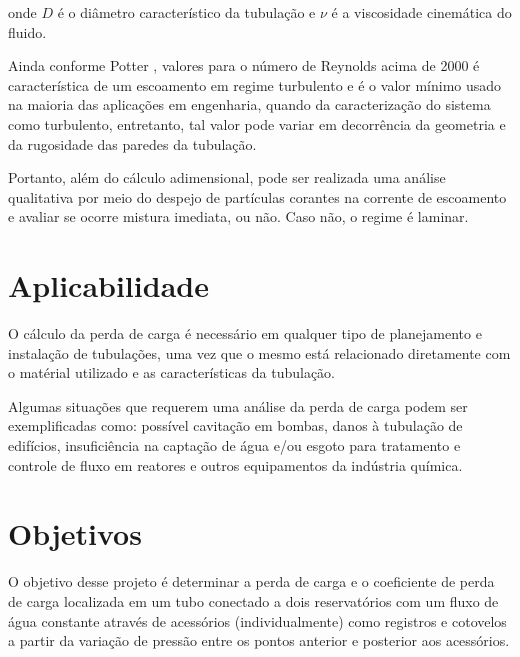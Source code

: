 onde $D$ é o diâmetro característico da tubulação e $\nu$ é a viscosidade 
cinemática do fluido.

Ainda conforme Potter \cite{Potter15}, valores para o número de 
Reynolds acima de 2000 é 
característica de um escoamento em regime
turbulento e é o valor mínimo usado na maioria das aplicações em engenharia, 
quando da caracterização do sistema como
turbulento, entretanto, tal valor pode variar em decorrência da geometria e da 
rugosidade das paredes da tubulação.

Portanto, além do cálculo adimensional, pode ser realizada uma análise 
qualitativa por meio do despejo de partículas
corantes na corrente de escoamento e avaliar se ocorre mistura imediata, ou 
não. Caso não, o regime é laminar.

\section{Aplicabilidade}

O cálculo da perda de carga é necessário em qualquer tipo de planejamento
e instalação de tubulações, uma vez que o mesmo está relacionado diretamente
com o matérial utilizado e as características da tubulação.

 Algumas situações que requerem uma análise da perda de carga podem ser 
exemplificadas como: possível cavitação em
bombas, danos à tubulação de edifícios, insuficiência na captação de água e/ou 
esgoto para tratamento e controle de
fluxo em reatores e outros 
equipamentos da indústria química.

\section{Objetivos}

O objetivo desse projeto é determinar a perda de carga e o coeficiente de 
perda de carga localizada em um tubo conectado
a dois reservatórios com um fluxo de água constante através de acessórios 
(individualmente) como registros e cotovelos a
partir da variação de pressão entre os pontos anterior e 
posterior aos acessórios.
